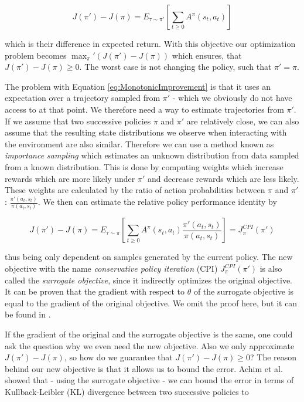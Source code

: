\begin{equation} \label{eq:MonotonicImprovement}
  J(\pi') - J(\pi) = E_{\tau \sim \pi'}\left[\sum_{t\geq0} A^\pi(s_t, a_t)\right]
\end{equation}

which is their difference in expected return. With this objective our optimization problem becomes $\max_\pi' (J(\pi') - J(\pi))$ which ensures, that $J(\pi') - J(\pi) \geq 0$. The worst case is not changing the policy, such that $\pi'=\pi$.

The problem with Equation \ref{eq:MonotonicImprovement} is that it uses an expectation over a trajectory sampled from $\pi'$ - which we obviously do not have access to at that point. We therefore need a way to estimate trajectories from $\pi'$. If we assume that two successive policies $\pi$ and $\pi'$ are relatively close, we can also assume that the resulting state distributions we observe when interacting with the environment are also similar. Therefore we can use a method known as \textit{importance sampling} which estimates an unknown distribution from data sampled from a known distribution. This is done by computing weights which increase rewards which are more likely under $\pi'$ and decrease rewards which are less likely. These weights are calculated by the ratio of action probabilities between $\pi$ and $\pi'$: $\frac{\pi'(a_t, s_t)}{\pi(a_t, s_t)}$. We then can estimate the relative policy performance identity by

\begin{equation}
  J(\pi') - J(\pi) = E_{\tau \sim \pi}\left[\sum_{t\geq0} A^\pi(s_t, a_t) \frac{\pi'(a_t, s_t)}{\pi(a_t, s_t)}\right] = J^{CPI}_\pi(\pi')
\end{equation}

thus being only dependent on samples generated by the current policy. The new objective with the name \textit{conservative policy iteration} (CPI) $J^{CPI}_\pi(\pi')$ is also called the \textit{surrogate objective}, since it indirectly optimizes the original objective. It can be proven that the gradient with respect to $\theta$ of the surrogate objective is equal to the gradient of the original objective. We omit the proof here, but it can be found in \cite{foundations2019graesser}. 

If the gradient of the original and the surrogate objective is the same, one could ask the question why we even need the new objective. Also we only approximate $J(\pi') - J(\pi)$, so how do we guarantee that $J(\pi') - J(\pi) \geq 0$? The reason behind our new objective is that it allows us to bound the error. Achim et al. \cite{achiam2017constrained} showed that - using the surrogate objective - we can bound the error in terms of Kullback-Leibler (KL) divergence between two successive policies to

